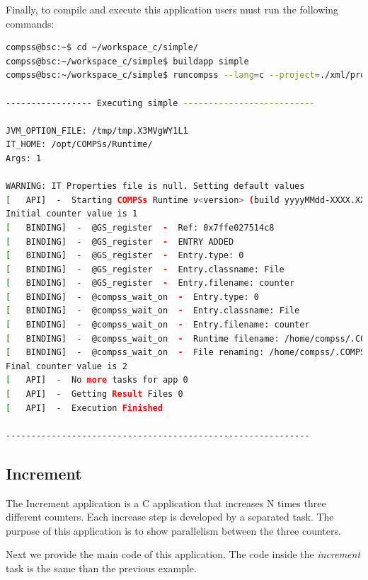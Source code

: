Finally, to compile and execute this application users must run the following commands:

\begin{lstlisting}[language=bash]
compss@bsc:~$ cd ~/workspace_c/simple/
compss@bsc:~/workspace_c/simple$ buildapp simple
compss@bsc:~/workspace_c/simple$ runcompss --lang=c --project=./xml/project.xml --resources=./xml/resources.xml ~/workspace_c/simple/master/simple 1

----------------- Executing simple --------------------------

JVM_OPTION_FILE: /tmp/tmp.X3MVgWY1L1 
IT_HOME: /opt/COMPSs/Runtime/ 
Args: 1 

WARNING: IT Properties file is null. Setting default values
[   API]  -  Starting COMPSs Runtime v<version> (build yyyyMMdd-XXXX.XXXX)
Initial counter value is 1
[   BINDING]  -  @GS_register  -  Ref: 0x7ffe027514c8
[   BINDING]  -  @GS_register  -  ENTRY ADDED
[   BINDING]  -  @GS_register  -  Entry.type: 0
[   BINDING]  -  @GS_register  -  Entry.classname: File
[   BINDING]  -  @GS_register  -  Entry.filename: counter
[   BINDING]  -  @compss_wait_on  -  Entry.type: 0
[   BINDING]  -  @compss_wait_on  -  Entry.classname: File
[   BINDING]  -  @compss_wait_on  -  Entry.filename: counter
[   BINDING]  -  @compss_wait_on  -  Runtime filename: /home/compss/.COMPSs/simple_01/tmpFiles/d1v2_1446817611279.IT
[   BINDING]  -  @compss_wait_on  -  File renaming: /home/compss/.COMPSs/simple_01/tmpFiles/d1v2_1446817611279.IT to counter
Final counter value is 2
[   API]  -  No more tasks for app 0
[   API]  -  Getting Result Files 0
[   API]  -  Execution Finished

------------------------------------------------------------
\end{lstlisting}


\subsection{Increment}
The Increment application is a C application that increases N times three different counters. Each increase step is developed by a separated task. The
purpose of this application is to show parallelism between the three counters.

Next we provide the main code of this application. The code inside the \textit{increment} task is the same than the previous example. 

